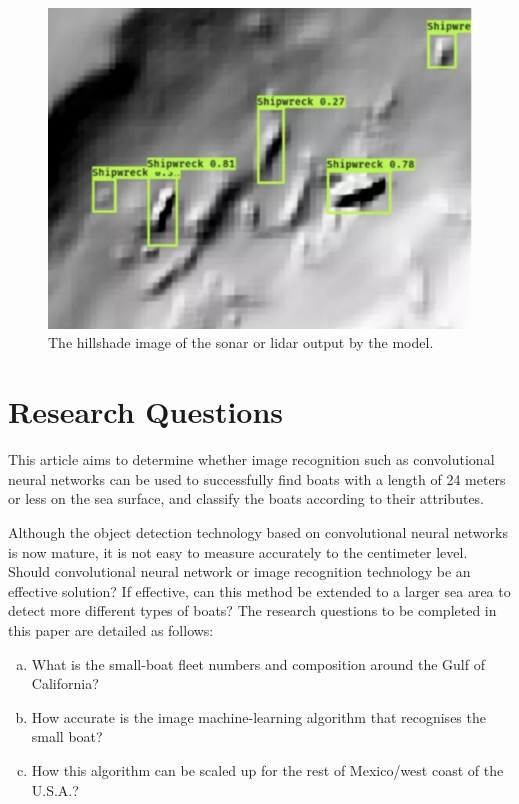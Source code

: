 \begin{figure}[!t]
    \centering
    \includegraphics[scale=0.5]{img/shipwrecks.png}
    \caption{The hillshade image of the sonar or lidar output by the model.}
    \label{fig:shipwrecks}
\end{figure}


\newpage
\section{Research Questions}
This article aims to determine whether image recognition such as convolutional neural networks can be used to successfully find boats with a length of 24 meters or less on the sea surface, and classify the boats according to their attributes.

Although the object detection technology based on convolutional neural networks is now mature, it is not easy to measure accurately to the centimeter level. Should convolutional neural network or image recognition technology be an effective solution? If effective, can this method be extended to a larger sea area to detect more different types of boats? The research questions to be completed in this paper are detailed as follows:

\begin{enumerate}[(a)]

    \item What is the small-boat fleet numbers and composition around the Gulf of California?
    
    \item How accurate is the image machine-learning algorithm that recognises the small boat?
    
    \item How this algorithm can be scaled up for the rest of Mexico/west coast of the U.S.A.?
\end{enumerate}



